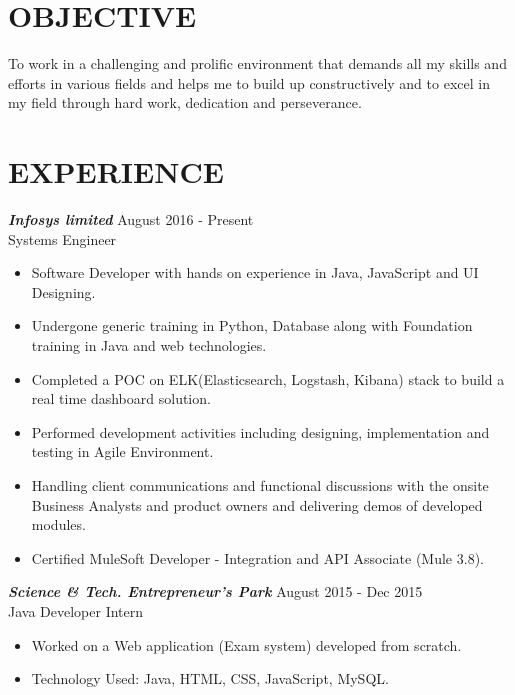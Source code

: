 \documentclass[margin, 10pt]{res} %
\begin{document}
\begin{resume}

 
\section{OBJECTIVE}  
To work in a challenging and prolific environment that demands all my skills and efforts in various fields and helps me to build up constructively and to excel in my field through hard work, dedication and perseverance.


 
\section{EXPERIENCE}
{\sl \textbf{Infosys limited}} \hfill August 2016 - Present \\
Systems Engineer
\begin{itemize}
\item Software Developer with hands on experience in Java, JavaScript and UI Designing.  
\item Undergone generic training in Python, Database along with Foundation training in Java and web technologies.
\item Completed a POC on ELK(Elasticsearch, Logstash, Kibana) stack to build a real time dashboard solution.
\item Performed development activities including designing, implementation and testing in Agile Environment.  
\item 	Handling client communications and functional discussions with the onsite Business Analysts and product owners and delivering demos of developed modules.  
\item Certified MuleSoft Developer - Integration and API Associate (Mule 3.8).   
\end{itemize} 
{\sl\textbf{Science \& Tech. Entrepreneur’s Park}} \hfill August 2015 - Dec 2015 \\
	Java Developer Intern 
\begin{itemize} \itemsep -2pt %
\item 	Worked on a Web application (Exam system) developed from scratch. 
\item 	Technology Used: Java, HTML, CSS, JavaScript, MySQL.
\end{itemize}



\end{resume}
\end{document}
